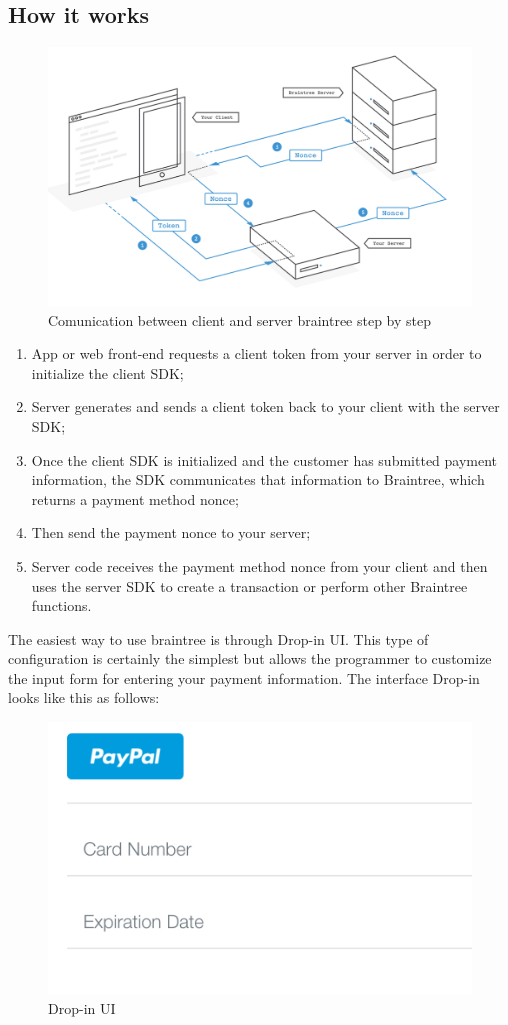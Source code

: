 \subsection{How it works}
\begin{figure}[htb]
  \centering
  \includegraphics[width=1.0\linewidth]{images/chapter2/braintree-comunicaiton.png}\hfill
  \caption[Interaction client-braintree]{Comunication between client and server braintree step by step}
  \label{fig:braintree_server_comunication}
\end{figure}
\begin{enumerate}
\item App or web front-end requests a client token from your server in order to initialize the client SDK;
\item Server generates and sends a client token back to your client with the server SDK;
\item Once the client SDK is initialized and the customer has submitted payment information, the SDK communicates that information to Braintree, which returns a payment method nonce;
\item Then send the payment nonce to your server;
\item Server code receives the payment method nonce from your client and then uses the server SDK to create a transaction or perform other Braintree functions.
\end{enumerate}
The easiest way to use braintree is through Drop-in UI. This type of configuration is certainly the simplest but allows the programmer to customize the input form for entering your payment information. The interface Drop-in looks like this as follows:
\begin{figure}[htb]
\centering
\includegraphics[width=0.6\linewidth]{images/chapter2/drop-in.png}\hfill
\caption[Drop-in UI]{ Drop-in UI}
\label{fig:drop_in_ui}
\end{figure}
